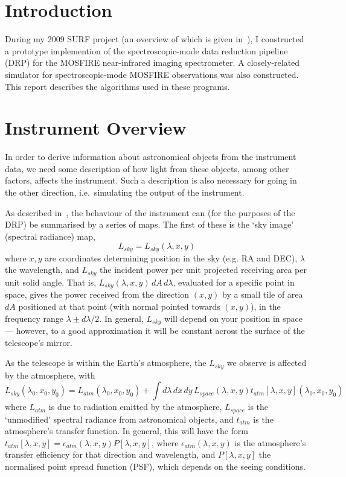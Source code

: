 \section{Introduction}

During my 2009 SURF project (an overview of which is given in~\cite{surfreport}),
I constructed a prototype implemention of the spectroscopic-mode
data reduction pipeline (DRP) for the MOSFIRE near-infrared imaging
spectrometer. A closely-related simulator for spectroscopic-mode MOSFIRE
observations was also constructed. This report describes the algorithms
used in these programs.

\section{Instrument Overview}

In order to derive information about astronomical objects
from the instrument data, we need some description of how light from these
objects, among other factors, affects the instrument. Such a description
is also necessary for going in the other direction, i.e.\ simulating
the output of the instrument.

As described in~\cite{surfreport}, the behaviour of the instrument can (for the
purposes of the DRP) be summarised by a series of maps. The first of
these is the `sky image' (spectral radiance) map,
\[
L_{sky} = L_{sky} (\lambda, x, y)
\]
where $x,y$ are coordinates determining position in the sky (e.g. RA
and DEC), $\lambda$ the wavelength, and $L_{sky}$ the incident power
per unit projected receiving area per unit solid angle. That is,
$L_{sky}(\lambda, x, y)\, dA \, d\lambda$, evaluated for a specific
point in space, gives the power received from the direction $(x,y)$
by a small tile of area $dA$ positioned at that point (with
normal pointed towards $(x,y)$), in the frequency range $\lambda \pm
d\lambda/2$. In general, $L_{sky}$ will depend on your position in
space --- however, to a good approximation it will be constant across
the surface of the telescope's mirror.

As the telescope is within the Earth's atmosphere, the $L_{sky}$
we observe is affected by the atmosphere, with
\[
L_{sky}(\lambda_0, x_0, y_0) = L_{atm}(\lambda_0, x_0, y_0) + \int d\lambda\, dx\, dy\, L_{space}(\lambda, x, y) t_{atm}[\lambda, x, y](\lambda_0, x_0, y_0)
\]
where $L_{atm}$ is due to radiation emitted by the atmosphere,
$L_{space}$ is the `unmodified' spectral radiance from astronomical
objects, and $t_{atm}$ is the atmosphere's transfer function.
In general, this will have the form $t_{atm}[\lambda, x, y] =
\epsilon_{atm}(\lambda, x, y) P[\lambda, x, y]$, where $\epsilon_{atm}
(\lambda, x, y)$ is the atmosphere's transfer efficiency for that
direction and wavelength, and $P[\lambda, x, y]$ the normalised point
spread function (PSF), which depends on the seeing conditions.

